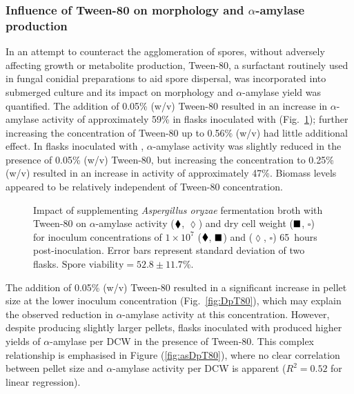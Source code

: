 \subsubsection{Influence of Tween-80 on morphology and $\alpha$-amylase production}

In an attempt to counteract the agglomeration of spores, without adversely affecting growth or metabolite production, Tween-80, a surfactant routinely used in fungal conidial preparations to aid spore dispersal, was incorporated into submerged culture and its impact on morphology and $\alpha$-amylase yield was quantified. The addition of 0.05\% (w/v) Tween-80 resulted in an increase in $\alpha$-amylase activity of approximately 59\% in flasks inoculated with  (Fig.~\ref{fig:aaDCWT80}); further increasing the concentration of Tween-80 up to 0.56\% (w/v) had little additional effect. In flasks inoculated with , $\alpha$-amylase activity was slightly reduced in the presence of 0.05\% (w/v) Tween-80, but increasing the concentration to 0.25\% (w/v) resulted in an increase in activity of approximately 47\%. Biomass levels appeared to be relatively independent of Tween-80 concentration.

\begin{figure}[tb]
	\centering
	\caption{Impact of supplementing \emph{Aspergillus oryzae} fermentation broth with Tween-80 on $\alpha$-amylase activity ($\blacklozenge$, $\lozenge$) and dry cell weight ($\blacksquare$, $\square$) for inoculum concentrations of $1 \times 10^7$ ($\blacklozenge$, $\blacksquare$) and  ($\lozenge$, $\square$) 65~hours post-inoculation. Error bars represent standard deviation of two flasks. $\mbox{Spore viability} = 52.8 \pm 11.7$\%.}
	\label{fig:aaDCWT80}
\end{figure}

The addition of 0.05\% (w/v) Tween-80 resulted in a significant increase in pellet size at the lower inoculum concentration (Fig.~\ref{fig:DpT80}), which may explain the observed reduction in $\alpha$-amylase activity at this concentration. However, despite producing slightly larger pellets, flasks inoculated with  produced higher yields of $\alpha$-amylase per DCW in the presence of Tween-80. This complex relationship is emphasised in Figure (\ref{fig:asDpT80}), where no clear correlation between pellet size and $\alpha$-amylase activity per DCW is apparent ($R^2 = 0.52$ for linear regression).

